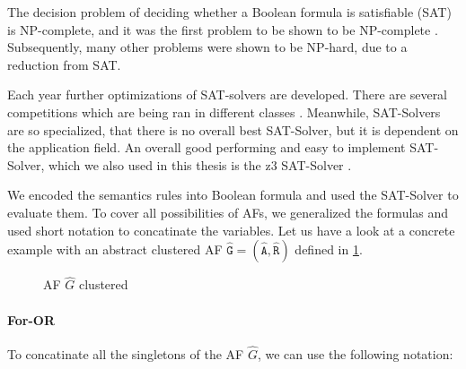 The decision problem of deciding whether a Boolean formula is satisfiable (SAT) is NP-complete, and it was the first problem to be shown to be NP-complete \cite{Cook71}. Subsequently, many other problems were shown to be NP-hard, due to a reduction from SAT.


Each year further optimizations of SAT-solvers are developed. There are several competitions which are being ran in different classes \cite{SAT-Solver-Competition}. Meanwhile, SAT-Solvers are so specialized, that there is no overall best SAT-Solver, but it is dependent on the application field. An overall good performing and easy to implement SAT-Solver, which we also used in this thesis is the z3 SAT-Solver \cite{z3-SAT-Solver}.


We encoded the semantics rules into Boolean formula and used the SAT-Solver to evaluate them. To cover all possibilities of AFs, we generalized the formulas and used short notation to concatinate the variables. Let us have a look at a concrete example with an abstract clustered AF $\mathtt{\hat{G}=(\hat{A}, \hat{R})}$ defined in \ref{af:backgroundSATExample1}.



\begin{figure}[h]
    \centering
    \caption{\ac{AF} $\hat{G}$ clustered}
    \label{af:backgroundSATExample1}
\end{figure}

\paragraph{For-OR} To concatinate all the singletons of the AF $\hat{G}$, we can use the following notation:

